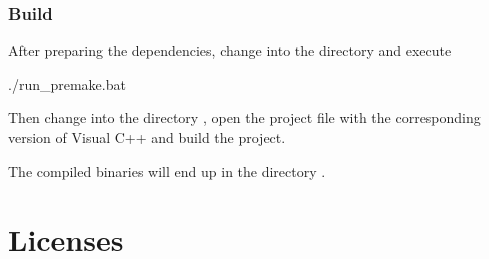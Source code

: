 \subsection{Build}

After preparing the dependencies, change into the directory
 and execute

\begin{VerbatimBoth}
  ./run_premake.bat
\end{VerbatimBoth}

Then change into the directory , open the
project file with the corresponding version of Visual C++ and build
the project.

The compiled binaries will end up in the directory .

\chapter{Licenses}

\scriptsize

\normalsize

\scriptsize

\normalsize




